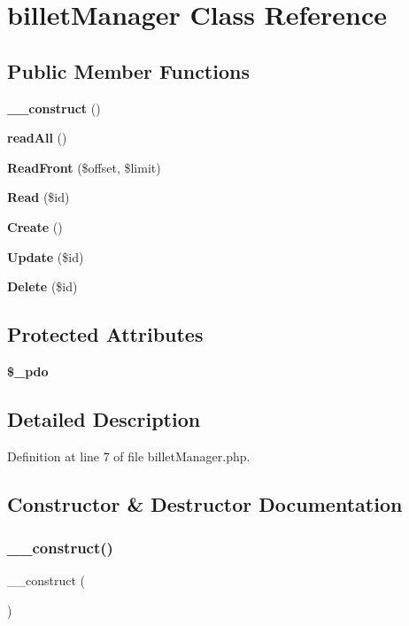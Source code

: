 \section{billet\+Manager Class Reference}
\label{class_src_1_1_managers_1_1billet_manager}
\subsection*{Public Member Functions}
\begin{DoxyCompactItemize}
\item 
\textbf{ \+\_\+\+\_\+construct} ()
\item 
\textbf{ read\+All} ()
\item 
\textbf{ Read\+Front} (\$offset, \$limit)
\item 
\textbf{ Read} (\$id)
\item 
\textbf{ Create} ()
\item 
\textbf{ Update} (\$id)
\item 
\textbf{ Delete} (\$id)
\end{DoxyCompactItemize}
\subsection*{Protected Attributes}
\begin{DoxyCompactItemize}
\item 
\textbf{ \$\+\_\+pdo}
\end{DoxyCompactItemize}


\subsection{Detailed Description}


Definition at line 7 of file billet\+Manager.\+php.



\subsection{Constructor \& Destructor Documentation}
\mbox{\label{class_src_1_1_managers_1_1billet_manager_a095c5d389db211932136b53f25f39685}} 
\subsubsection{\+\_\+\+\_\+construct()}
{\footnotesize\ttfamily \+\_\+\+\_\+construct (\begin{DoxyParamCaption}{ }\end{DoxyParamCaption})}



